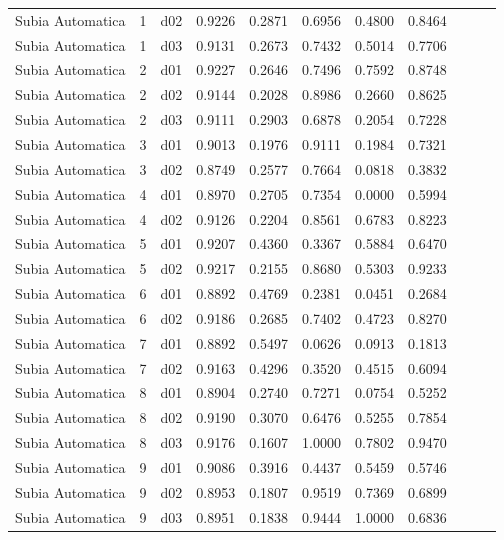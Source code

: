 \begin{landscape}
\begin{longtable}{p{5cm}rrrrrrrrrr}
     Subia Automatica  & 1 &     d02 &   0.9226 &  0.2871 &    0.6956 &   0.4800 &    0.8464 \\
     Subia Automatica  & 1 &     d03 &   0.9131 &  0.2673 &    0.7432 &   0.5014 &    0.7706 \\
     Subia Automatica  & 2 &     d01 &   0.9227 &  0.2646 &    0.7496 &   0.7592 &    0.8748 \\
     Subia Automatica  & 2 &     d02 &   0.9144 &  0.2028 &    0.8986 &   0.2660 &    0.8625 \\
     Subia Automatica  & 2 &     d03 &   0.9111 &  0.2903 &    0.6878 &   0.2054 &    0.7228 \\
     Subia Automatica  & 3 &     d01 &   0.9013 &  0.1976 &    0.9111 &   0.1984 &    0.7321 \\
     Subia Automatica  & 3 &     d02 &   0.8749 &  0.2577 &    0.7664 &   0.0818 &    0.3832 \\
     Subia Automatica  & 4 &     d01 &   0.8970 &  0.2705 &    0.7354 &   0.0000 &    0.5994 \\
     Subia Automatica  & 4 &     d02 &   0.9126 &  0.2204 &    0.8561 &   0.6783 &    0.8223 \\
     Subia Automatica  & 5 &     d01 &   0.9207 &  0.4360 &    0.3367 &   0.5884 &    0.6470 \\
     Subia Automatica  & 5 &     d02 &   0.9217 &  0.2155 &    0.8680 &   0.5303 &    0.9233 \\
     Subia Automatica  & 6 &     d01 &   0.8892 &  0.4769 &    0.2381 &   0.0451 &    0.2684 \\
     Subia Automatica  & 6 &     d02 &   0.9186 &  0.2685 &    0.7402 &   0.4723 &    0.8270 \\
     Subia Automatica  & 7 &     d01 &   0.8892 &  0.5497 &    0.0626 &   0.0913 &    0.1813 \\
     Subia Automatica  & 7 &     d02 &   0.9163 &  0.4296 &    0.3520 &   0.4515 &    0.6094 \\
     Subia Automatica  & 8 &     d01 &   0.8904 &  0.2740 &    0.7271 &   0.0754 &    0.5252 \\
     Subia Automatica  & 8 &     d02 &   0.9190 &  0.3070 &    0.6476 &   0.5255 &    0.7854 \\
     Subia Automatica  & 8 &     d03 &   0.9176 &  0.1607 &    1.0000 &   0.7802 &    0.9470 \\
     Subia Automatica  & 9 &     d01 &   0.9086 &  0.3916 &    0.4437 &   0.5459 &    0.5746 \\
     Subia Automatica  & 9 &     d02 &   0.8953 &  0.1807 &    0.9519 &   0.7369 &    0.6899 \\
     Subia Automatica  & 9 &     d03 &   0.8951 &  0.1838 &    0.9444 &   1.0000 &    0.6836 \\ 
 
\end{longtable}
\end{landscape}
